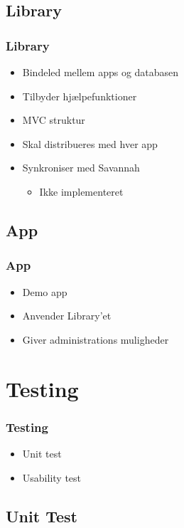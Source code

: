 \documentclass{beamer}
\begin{document}
\subsection{Library}

\begin{frame}
	\frametitle{Library}
	\begin{itemize}
		\item Bindeled mellem apps og databasen
		\item Tilbyder hj\ae{}lpefunktioner
		\item MVC struktur
		\item Skal distribueres med hver app
		\item Synkroniser med Savannah
		\begin{itemize}
			\item Ikke implementeret
		\end{itemize}
	\end{itemize}
\end{frame}

\subsection{App}

\begin{frame}
	\frametitle{App}
	\begin{itemize}
		\item Demo app
		\item Anvender Library'et
		\item Giver administrations muligheder
	\end{itemize}
\end{frame}

\section{Testing}

\begin{frame}
	\frametitle{Testing}
	\begin{itemize}
		\item Unit test
		\item Usability test
	\end{itemize}
\end{frame}

\subsection{Unit Test}
\end{document}
